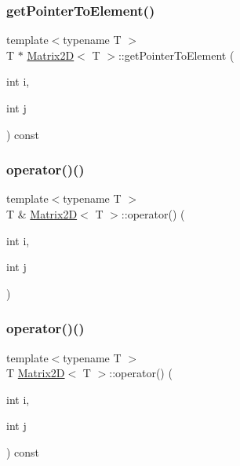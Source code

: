 \mbox{\label{classMatrix2D_ac3d6fbe385374e65ce00a34be5a7d323_ac3d6fbe385374e65ce00a34be5a7d323}} 
\subsubsection{\texorpdfstring{get\+Pointer\+To\+Element()}{getPointerToElement()}}
{\footnotesize\ttfamily template$<$typename T $>$ \\
T $\ast$ \mbox{\hyperlink{classMatrix2D}{Matrix2D}}$<$ T $>$\+::get\+Pointer\+To\+Element (\begin{DoxyParamCaption}\item[{int}]{i,  }\item[{int}]{j }\end{DoxyParamCaption}) const}

\mbox{\label{classMatrix2D_abcb61863666c4e17352c9fd2fc0a254a_abcb61863666c4e17352c9fd2fc0a254a}} 
\subsubsection{\texorpdfstring{operator()()}{operator()()}\hspace{0.1cm}{\footnotesize\ttfamily [1/2]}}
{\footnotesize\ttfamily template$<$typename T $>$ \\
T \& \mbox{\hyperlink{classMatrix2D}{Matrix2D}}$<$ T $>$\+::operator() (\begin{DoxyParamCaption}\item[{int}]{i,  }\item[{int}]{j }\end{DoxyParamCaption})}

\mbox{\label{classMatrix2D_a1a14d98d090d0d1cbda97a8fa797f1c5_a1a14d98d090d0d1cbda97a8fa797f1c5}} 
\subsubsection{\texorpdfstring{operator()()}{operator()()}\hspace{0.1cm}{\footnotesize\ttfamily [2/2]}}
{\footnotesize\ttfamily template$<$typename T $>$ \\
T \mbox{\hyperlink{classMatrix2D}{Matrix2D}}$<$ T $>$\+::operator() (\begin{DoxyParamCaption}\item[{int}]{i,  }\item[{int}]{j }\end{DoxyParamCaption}) const}

